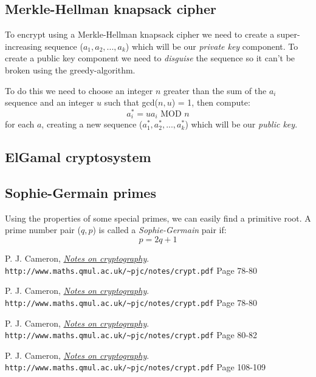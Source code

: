 \documentclass[12pt]{article}
\begin{document}
	
	
	\subsection*{Merkle-Hellman knapsack cipher \cite{knapsack-cipher}}
	To encrypt using a Merkle-Hellman knapsack cipher we need to create a super-increasing sequence ($a_1,a_2,...,a_k$) which will be our \textit{private key} component. To create a public key component we need to \textit{disguise} the sequence so it can't be broken using the greedy-algorithm. 
	
	To do this we need to choose an integer $n$ greater than the sum of the $a_i$ sequence and an integer $u$ such that gcd($n,u$) = 1, then compute:
	$$
	a_i^* = ua_i \text{ MOD } n
	$$
	for each $a$, creating a new sequence ($a_1^*,a_2^*,...,a_k^*$) which will be our \textit{public key}.
	
	
	\subsection*{ElGamal cryptosystem}
	
	
	
	\subsection*{Sophie-Germain primes \cite{sophie-germain}}
	Using the properties of some special primes, we can easily find a primitive root. A prime number pair ($q,p$) is called a \textit{Sophie-Germain} pair if:
	$$
	p = 2q + 1
	$$
		
	
	\newpage
	\begin{thebibliography}{99}
		
		P. J. Cameron, 
		\textit{\underline{Notes on cryptography}}.
		\\\texttt{http://www.maths.qmul.ac.uk/\textasciitilde{}pjc/notes/crypt.pdf}
		Page 78-80  
		
		P. J. Cameron, 
		\textit{\underline{Notes on cryptography}}.
		\\\texttt{http://www.maths.qmul.ac.uk/\textasciitilde{}pjc/notes/crypt.pdf}
		Page 78-80  
		
		P. J. Cameron, 
		\textit{\underline{Notes on cryptography}}.
		\\\texttt{http://www.maths.qmul.ac.uk/\textasciitilde{}pjc/notes/crypt.pdf}
		Page 80-82
		
		P. J. Cameron, 
		\textit{\underline{Notes on cryptography}}.
		\\\texttt{http://www.maths.qmul.ac.uk/\textasciitilde{}pjc/notes/crypt.pdf}
		Page 108-109
		
	\end{thebibliography}
\end{document}

